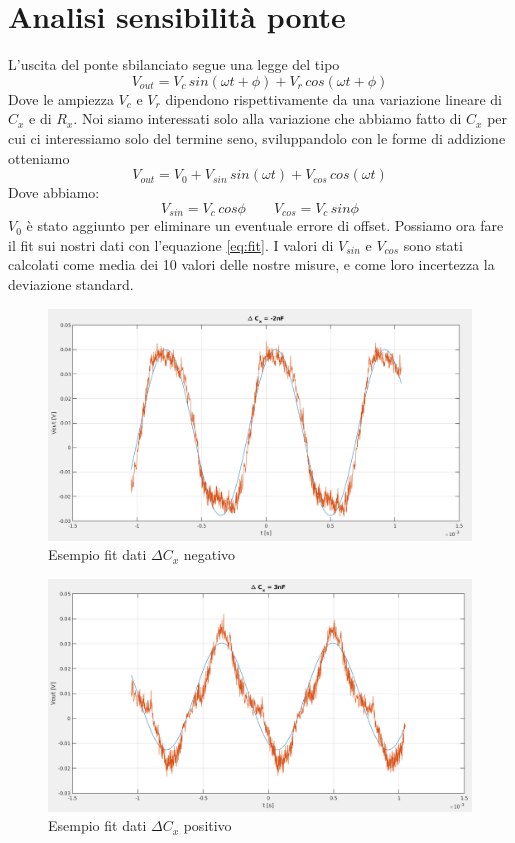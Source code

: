 \documentclass[12pt,]{article}
\begin{document}
\section{Analisi sensibilità ponte}
L'uscita del ponte sbilanciato segue una legge del tipo
\begin{equation}
\label{eq:gen}
V_{out} = V_c\, sin(\omega t + \phi) + V_r\, cos(\omega t + \phi)
\end{equation}
Dove le ampiezza $V_c$ e $V_r$ dipendono rispettivamente da una variazione lineare di $C_x$ e di $R_x$. Noi siamo interessati solo alla variazione che abbiamo fatto di $C_x$ per cui ci interessiamo solo del termine seno, sviluppandolo con le forme di addizione otteniamo
\begin{equation}
\label{eq:fit}
V_{out}=V_0 + V_{sin}\, sin (\omega t) + V_{cos} \,cos(\omega t)
\end{equation}
Dove abbiamo:
\begin{equation}
V_{sin} = V_c\, cos\phi \qquad V_{cos} = V_c\, sin\phi
\end{equation}
$V_0$ è stato aggiunto per eliminare un eventuale errore di offset. Possiamo ora fare il fit sui nostri dati con l'equazione \eqref{eq:fit}.
I valori di $V_{sin}$ e $V_{cos}$ sono stati calcolati come media dei 10 valori delle nostre misure, e come loro incertezza la deviazione standard.
\begin{figure}[H]
\centering
\includegraphics[width=\textwidth]{fit1}
\caption{Esempio fit dati $\Delta C_x$ negativo}
\end{figure}
\begin{figure}[H]
\centering
\includegraphics[width=\textwidth]{fit2}
\caption{Esempio fit dati $\Delta C_x$ positivo}
\end{figure}
\end{document}
